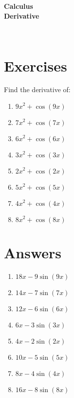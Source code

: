 

\begin{centering}
\bf{ \Large  Calculus \\
Derivative \\
}
\end{centering}
\ 
\section{Exercises}
Find the derivative of:
\begin{enumerate}
    \item $9 x^{2} + \cos{\left(9 x \right)}$  \item $7 x^{2} + \cos{\left(7 x \right)}$  \item $6 x^{2} + \cos{\left(6 x \right)}$  \item $3 x^{2} + \cos{\left(3 x \right)}$  \item $2 x^{2} + \cos{\left(2 x \right)}$  \item $5 x^{2} + \cos{\left(5 x \right)}$  \item $4 x^{2} + \cos{\left(4 x \right)}$  \item $8 x^{2} + \cos{\left(8 x \right)}$
\end{enumerate}
\section{Answers}
\begin{enumerate}
    \item $18 x - 9 \sin{\left(9 x \right)}$  \item $14 x - 7 \sin{\left(7 x \right)}$  \item $12 x - 6 \sin{\left(6 x \right)}$  \item $6 x - 3 \sin{\left(3 x \right)}$  \item $4 x - 2 \sin{\left(2 x \right)}$  \item $10 x - 5 \sin{\left(5 x \right)}$  \item $8 x - 4 \sin{\left(4 x \right)}$  \item $16 x - 8 \sin{\left(8 x \right)}$
\end{enumerate}






